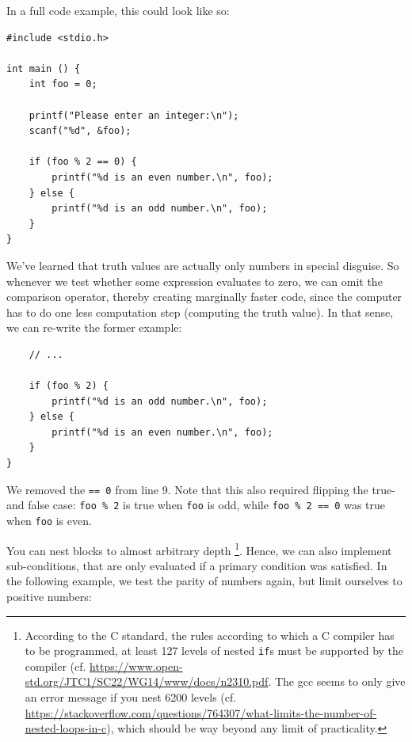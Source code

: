 In a full code example, this could look like so:
\begin{codebox}[ifElse.c]
\begin{verbatim}
#include <stdio.h>

int main () {
    int foo = 0;
  
    printf("Please enter an integer:\n");
    scanf("%d", &foo);

    if (foo % 2 == 0) {
        printf("%d is an even number.\n", foo);
    } else {
        printf("%d is an odd number.\n", foo);
    }
}
\end{verbatim}
\end{codebox}

\begin{hintbox}
We've learned that truth values are actually only numbers in special disguise. So whenever we test whether some expression evaluates to zero, we can omit the comparison operator, thereby creating marginally faster code, since the computer has to do one less computation step (computing the truth value). In that sense, we can re-write the former example:

\begin{codebox}[ifElseImplicitComparison.c]
\begin{verbatim}
    // ...
    
    if (foo % 2) {
        printf("%d is an odd number.\n", foo);
    } else {
        printf("%d is an even number.\n", foo);
    }
}
\end{verbatim}
\end{codebox}

We removed the \texttt{== 0} from line 9. Note that this also required flipping the true- and false case: \texttt{foo \% 2} is true when \texttt{foo} is odd, while \texttt{foo \% 2 == 0} was true when \texttt{foo} is even.
\end{hintbox}

You can nest  blocks to almost arbitrary depth
\footnote{According to the C standard, \ie the rules according to which a C compiler has to be programmed, at least 127 levels of nested \texttt{if}s must be supported by the compiler (cf. \url{https://www.open-std.org/JTC1/SC22/WG14/www/docs/n2310.pdf}. The gcc seems to only give an error message if you nest 6200 levels (cf. \url{https://stackoverflow.com/questions/764307/what-limits-the-number-of-nested-loops-in-c}), which should be way beyond any limit of practicality.}.
Hence, we can also implement sub-conditions, that are only evaluated if a primary condition was satisfied. In the following example, we test the parity of numbers again, but limit ourselves to positive numbers:

